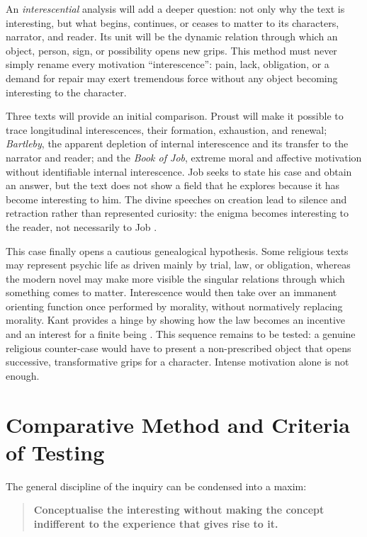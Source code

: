\documentclass[11pt,a4paper]{article}
\begin{document}
An \emph{interescential} analysis will add a deeper question: not only why the
text is interesting, but what begins, continues, or ceases to matter to its
characters, narrator, and reader. Its unit will be the dynamic relation through
which an object, person, sign, or possibility opens new grips. This method must
never simply rename every motivation ``interescence'': pain, lack, obligation,
or a demand for repair may exert tremendous force without any object becoming
interesting to the character.

Three texts will provide an initial comparison. Proust will make it possible to
trace longitudinal interescences, their formation, exhaustion, and renewal;
\emph{Bartleby}, the apparent depletion of internal interescence and its
transfer to the narrator and reader; and the \emph{Book of Job}, extreme moral
and affective motivation without identifiable internal interescence. Job seeks
to state his case and obtain an answer, but the text does not show a field that
he explores because it has become interesting to him. The divine speeches on
creation lead to silence and retraction rather than represented curiosity: the
enigma becomes interesting to the reader, not necessarily to Job
\parencite{jps1985tanakh}.

This case finally opens a cautious genealogical hypothesis. Some religious
texts may represent psychic life as driven mainly by trial, law, or obligation,
whereas the modern novel may make more visible the singular relations through
which something comes to matter. Interescence would then take over an immanent
orienting function once performed by morality, without normatively replacing
morality. Kant provides a hinge by showing how the law becomes an incentive and
an interest for a finite being \parencite{kant1848moralepratique}. This sequence
remains to be tested: a genuine religious counter-case would have to present a
non-prescribed object that opens successive, transformative grips for a
character. Intense motivation alone is not enough.

\section{Comparative Method and Criteria of Testing}

The general discipline of the inquiry can be condensed into a maxim:

\begin{quote}
\textbf{Conceptualise the interesting without making the concept indifferent to
the experience that gives rise to it.}
\end{quote}
\end{document}
